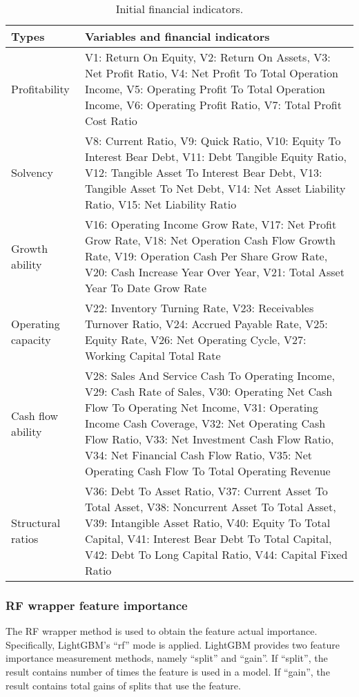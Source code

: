 \documentclass[review]{elsarticle}
\begin{document}
\begin{table}[H]
    \centering
    \caption{Initial financial indicators.}
    \label{table: 3}
    \begin{tabular}{p{90pt}p{370pt}}
    \midrule Types &
      Variables and financial indicators \\
    \midrule Profitability &
      V1: Return On Equity, V2: Return On Assets, V3: Net Profit Ratio, V4: Net Profit To Total Operation Income, V5: Operating Profit To Total Operation Income, V6: Operating Profit Ratio, V7: Total Profit Cost Ratio \\
    \midrule Solvency &
      V8: Current Ratio, V9: Quick Ratio, V10: Equity To Interest Bear Debt, V11: Debt Tangible Equity Ratio, V12: Tangible Asset To Interest Bear Debt, V13: Tangible Asset To Net Debt, V14: Net Asset Liability Ratio, V15: Net Liability Ratio \\
    \midrule Growth ability &
      V16: Operating Income Grow Rate, V17: Net Profit Grow Rate, V18: Net Operation Cash Flow Growth Rate, V19: Operation Cash Per Share Grow Rate, V20: Cash Increase Year Over Year, V21: Total Asset Year To Date Grow Rate \\
    \midrule Operating capacity &
      V22: Inventory Turning Rate, V23: Receivables Turnover Ratio, V24: Accrued Payable Rate, V25: Equity Rate, V26: Net Operating Cycle, V27: Working Capital Total Rate \\
    \midrule Cash flow ability &
      V28: Sales And Service Cash To Operating Income, V29: Cash Rate of Sales, V30: Operating Net Cash Flow To Operating Net Income, V31: Operating Income Cash Coverage, V32: Net Operating Cash Flow Ratio, V33: Net Investment Cash Flow Ratio, V34: Net Financial Cash Flow Ratio, V35: Net Operating Cash Flow To Total Operating Revenue \\
    \midrule Structural ratios &
        V36: Debt To Asset Ratio, V37: Current Asset To Total Asset, V38: Noncurrent Asset To Total Asset, V39: Intangible Asset Ratio, V40: Equity To Total Capital, V41: Interest Bear Debt To Total Capital, V42: Debt To Long Capital Ratio, V44: Capital Fixed Ratio \\
    \bottomrule
    \end{tabular}
\end{table}

\subsubsection{RF wrapper feature importance}
The RF wrapper method is used to obtain the feature actual importance. Specifically, LightGBM’s ``rf'' mode is applied. LightGBM provides two feature importance measurement methods, namely ``split'' and ``gain''. If ``split'', the result contains number of times the feature is used in a model. If ``gain'', the result contains total gains of splits that use the feature.
\end{document}
